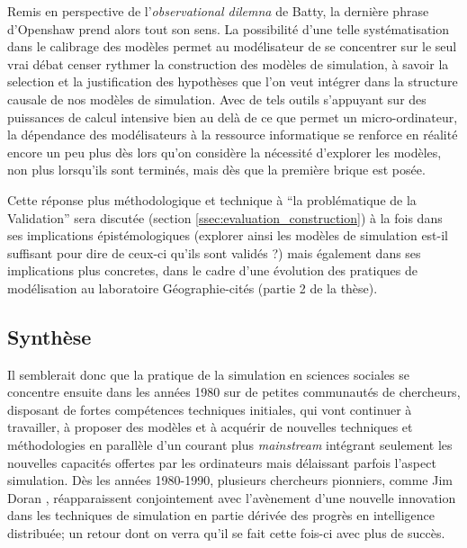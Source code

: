 Remis en perspective de l'\textit{observational dilemna} de Batty, la dernière phrase d'Openshaw prend alors tout son sens. La possibilité d'une telle systématisation dans le calibrage des modèles permet au modélisateur de se concentrer sur le seul vrai débat censer rythmer la construction des modèles de simulation, à savoir la selection et la justification des hypothèses que l'on veut intégrer dans la structure causale de nos modèles de simulation. Avec de tels outils s'appuyant sur des puissances de calcul intensive bien au delà de ce que permet un micro-ordinateur, la dépendance des modélisateurs à la ressource informatique se renforce en réalité encore un peu plus dès lors qu'on considère la nécessité d'explorer les modèles, non plus lorsqu'ils sont terminés, mais dès que la première brique est posée. 

Cette réponse plus méthodologique et technique à \enquote{la problématique de la Validation} sera discutée (section \ref{ssec:evaluation_construction}) à la fois dans ses implications épistémologiques (explorer ainsi les modèles de simulation est-il suffisant pour dire de ceux-ci qu'ils sont validés ?) mais également dans ses implications plus concretes, dans le cadre d'une évolution des pratiques de modélisation au laboratoire Géographie-cités (partie 2 de la thèse).

\subsection{Synthèse}


Il semblerait donc que la pratique de la simulation en sciences sociales se concentre ensuite dans les années 1980 sur de petites communautés de chercheurs, disposant de fortes compétences techniques initiales, qui vont continuer à travailler, à proposer des modèles et à acquérir de nouvelles techniques et méthodologies en parallèle d'un courant plus \textit{mainstream} intégrant seulement les nouvelles capacités offertes par les ordinateurs mais délaissant parfois l'aspect simulation. Dès les années 1980-1990, plusieurs chercheurs pionniers, comme Jim Doran \autocites{Doran1982, Doran1986}, réapparaissent conjointement avec l’avènement d'une nouvelle innovation dans les techniques de simulation en partie dérivée des progrès en intelligence distribuée; un retour dont on verra qu'il se fait cette fois-ci avec plus de succès.


